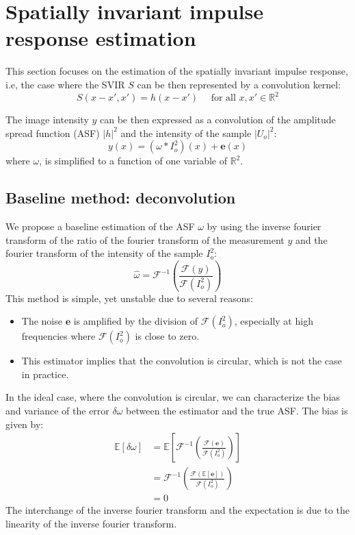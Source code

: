 \documentclass{article}
\begin{document}

\section{Spatially invariant impulse response estimation}
This section focuses on the estimation of the spatially invariant impulse response, i.e, the case where the SVIR $S$ can be then represented by a convolution kernel:
\begin{equation}
    S(x-x', x') = h(x-x') \quad \mbox{ for all } x, x' \in \mathbb{R}^2
\end{equation}

The image intensity $y$ can be then expressed as a convolution of the amplitude spread function (ASF) $|h|^2$ and the intensity of the sample $|U_o|^2$:
\begin{equation}
    y(x) = (\omega \ast I_o^2)(x) + \boldsymbol{e}(x)
\end{equation}
where $\omega$, is simplified to a function of one variable of $\mathbb{R}^2$.
\subsection{Baseline method: deconvolution}
We propose a baseline estimation of the ASF $\omega$ by using the inverse fourier transform of the ratio of the fourier transform of the measurement $y$ and the fourier transform of the intensity of the sample $I_o^2$:
\begin{equation}
    \hat\omega = \mathcal{F}^{-1}\left(\frac{\mathcal{F}(y)}{\mathcal{F}(I_o^2)}\right)
\end{equation}
This method is simple, yet unstable due to several reasons:
\begin{itemize}
    \item The noise $\boldsymbol{e}$ is amplified by the division of $\mathcal{F}(I_o^2)$, especially at high frequencies where $\mathcal{F}(I_o^2)$ is close to zero.
    \item This estimator implies that the convolution is circular, which is not the case in practice.
\end{itemize}

In the ideal case, where the convolution is circular, we can characterize the bias and variance of the error $\delta \omega$ between the estimator and the true ASF. The bias is given by:
\begin{align}
    \mathbb{E}[\delta\omega] &= \mathbb{E} \left[\mathcal{F}^{-1}\left(\frac{\mathcal{F}(\boldsymbol{e})}{\mathcal{F}(I_o^2)}\right) \right] \\
    & = \mathcal{F}^{-1}\left(\frac{\mathcal{F}(\mathbb{E}[\boldsymbol{e}])}{\mathcal{F}(I_o^2)}\right) \\
    &= 0
\end{align}
The interchange of the inverse fourier transform and the expectation is due to the linearity of the inverse fourier transform.
\end{document}
